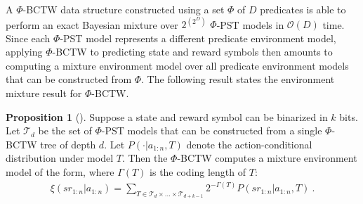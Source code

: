 \documentclass[letterpaper]{article} %
\newcommand {\bigO}{\mathcal{O}}
\theoremstyle{definition}
\newtheorem{prop}{Proposition}
\begin{document}
A $\Phi$-BCTW data structure constructed using a set $\Phi$ of $D$ predicates is able to perform an exact Bayesian mixture over $2^{(2^D)}$ $\Phi$-PST models in $\bigO(D)$ time.
Since each $\Phi$-PST model represents a different predicate environment model, applying $\Phi$-BCTW to predicting state and reward symbols then amounts to computing a mixture environment model over all predicate environment models that can be constructed from $\Phi$. The following result states the environment mixture result for $\Phi$-BCTW.
\begin{prop}[\cite{yang-zhao2022a}]
    \label{prop:pbctw_mixture}
    Suppose a state and reward symbol can be binarized in $k$ bits. Let $\mathcal{T}_d$ be the set of $\Phi$-PST models that can be constructed from a single $\Phi$-BCTW tree of depth $d$. 
    Let $P(\cdot | a_{1:n}, T)$ denote the action-conditional distribution under model $T$.
    Then the $\Phi$-BCTW computes a mixture environment model of the form, where $\Gamma(T)$ is the coding length of $T$:
    \begin{align}
        \label{eqn:phibctw_mixture}
        \xi(sr_{1:n} | a_{1:n}) = \sum_{T \in \mathcal{T}_{d} \times \ldots \times \mathcal{T}_{d+k-1}} 2^{-\Gamma(T)} %
        P(sr_{1:n} | a_{1:n}, T)~.
    \end{align}
\end{prop}
\end{document}
